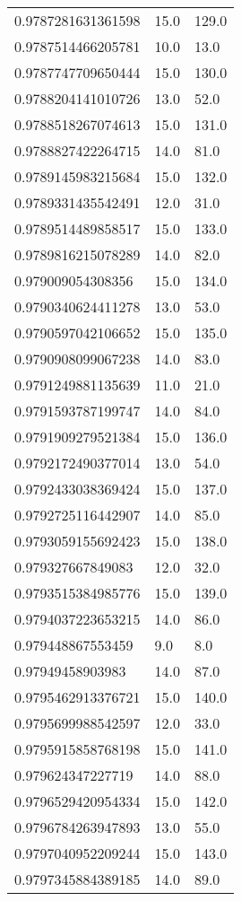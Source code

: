 \begin{center}
\begin{supertabular}[H]{p{0.30\textwidth}p{0.05\textwidth}p{0.05\textwidth}}
0.9787281631361598 & 15.0 & 129.0 \\ 
0.9787514466205781 & 10.0 & 13.0 \\ 
0.9787747709650444 & 15.0 & 130.0 \\ 
0.9788204141010726 & 13.0 & 52.0 \\ 
0.9788518267074613 & 15.0 & 131.0 \\ 
0.9788827422264715 & 14.0 & 81.0 \\ 
0.9789145983215684 & 15.0 & 132.0 \\ 
0.9789331435542491 & 12.0 & 31.0 \\ 
0.9789514489858517 & 15.0 & 133.0 \\ 
0.9789816215078289 & 14.0 & 82.0 \\ 
0.979009054308356 & 15.0 & 134.0 \\ 
0.9790340624411278 & 13.0 & 53.0 \\ 
0.9790597042106652 & 15.0 & 135.0 \\ 
0.9790908099067238 & 14.0 & 83.0 \\ 
0.9791249881135639 & 11.0 & 21.0 \\ 
0.9791593787199747 & 14.0 & 84.0 \\ 
0.9791909279521384 & 15.0 & 136.0 \\ 
0.9792172490377014 & 13.0 & 54.0 \\ 
0.9792433038369424 & 15.0 & 137.0 \\ 
0.9792725116442907 & 14.0 & 85.0 \\ 
0.9793059155692423 & 15.0 & 138.0 \\ 
0.979327667849083 & 12.0 & 32.0 \\ 
0.9793515384985776 & 15.0 & 139.0 \\ 
0.9794037223653215 & 14.0 & 86.0 \\ 
0.979448867553459 & 9.0 & 8.0 \\ 
0.97949458903983 & 14.0 & 87.0 \\ 
0.9795462913376721 & 15.0 & 140.0 \\ 
0.9795699988542597 & 12.0 & 33.0 \\ 
0.9795915858768198 & 15.0 & 141.0 \\ 
0.979624347227719 & 14.0 & 88.0 \\ 
0.9796529420954334 & 15.0 & 142.0 \\ 
0.9796784263947893 & 13.0 & 55.0 \\ 
0.9797040952209244 & 15.0 & 143.0 \\ 
0.9797345884389185 & 14.0 & 89.0 \\ 

\end{supertabular}
\end{center}
